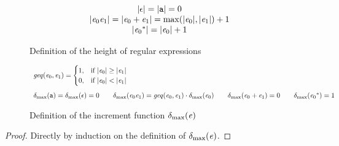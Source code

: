 
\begin{figure}
 $$
  \begin{array}{c}
   {\mid}{\ensuremath{\mathtt {\epsilon}}}{\mid}={\mid}{\mathtt {a}}{\mid}=0                                                              \\
   {\mid}{\mathit {e}_0\mathit {e}_1}{\mid}={\mid}{\mathit {e}_0\mathbin{+}\mathit {e}_1}{\mid}=\max({\mid}{\mathit {e}_0}{\mid},{\mid}{\mathit {e}_1}{\mid})+1 \\
   {\mid}{{\mathit {e}_0}^*}{\mid}={\mid}{\mathit {e}_0}{\mid}+1
  \end{array}
 $$
 \caption{Definition of the height of regular expressions}
 \label{fig:height}
\end{figure}

\begin{figure}
 $$
  \begin{array}{l}
   \mathit{geq}({\mathit {e}_0},{\mathit {e}_1})=
   \begin{cases}
    1, & \text{if } {\mid}{\ensuremath{\mathit {e}}_0}{\mid} \geq {\mid}{\ensuremath{\mathit {e}}_1}{\mid} \\
    0, & \text{if } {\mid}{\ensuremath{\mathit {e}}_0}{\mid} < {\mid}{\mathit {e}_1}{\mid}
   \end{cases} \\[4ex]
   {\delta_{\max}}({\mathtt {a}})={\delta_{\max}}({\mathtt {\epsilon}})=0                                      \qquad
   {\delta_{\max}}({\mathit {e}_0\mathit {e}_1})=\mathit{geq}({\mathit {e}_0},{\mathit {e}_1})\cdot{\delta_{\max}}({\mathit {e}_0}) \qquad
   {\delta_{\max}}({\mathit {e}_0\mathbin{+}\mathit {e}_1})=0                                         \qquad
   {\delta_{\max}}({{\mathit {e}_0}^*})=1
  \end{array}
 $$
 \caption{Definition of the increment function ${\delta_{\max}}({\mathit {e}})$}
 \label{fig:inc-pred}
\end{figure}

\begin{proof}
 Directly by induction on the definition of ${\delta_{\max}}({\mathit {e}})$.
\end{proof}

